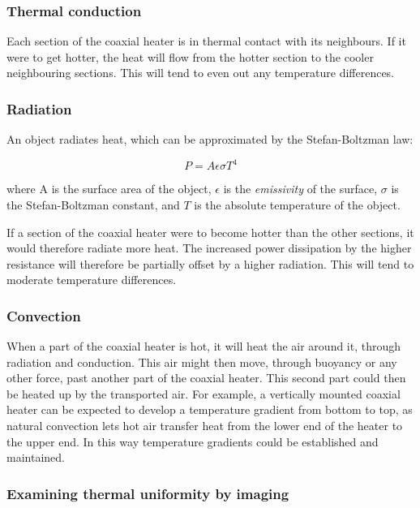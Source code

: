 \subsubsection{Thermal conduction}

Each section of the coaxial heater is in thermal contact with its neighbours. If
it were to get hotter, the heat will flow from the hotter section to the cooler
neighbouring sections. This will tend to even out any temperature differences.

\subsubsection{Radiation}

An object radiates heat, which can be approximated by the Stefan-Boltzman law:

\begin{equation}\label{eq:1}
	P=A \epsilon \sigma T^4
\end{equation}

where A is the surface area of the object, \(\epsilon\) is the
\textit{emissivity} of the surface, \(\sigma\) is the Stefan-Boltzman constant,
and \(T\) is the absolute temperature of the object. 

If a section of the coaxial heater were to become hotter than the other
sections, it would therefore radiate more heat. The increased power dissipation
by the higher resistance will therefore be partially offset by a higher
radiation. This will tend to moderate temperature differences.

\subsubsection{Convection}

When a part of the coaxial heater is hot, it will heat the air around it,
through radiation and conduction. This air might then move, through buoyancy or
any other force, past another part of the coaxial heater. This second part could
then be heated up by the transported air. For example, a vertically mounted
coaxial heater can be expected to develop a temperature gradient from bottom to
top, as natural convection lets hot air transfer heat from the lower end of the
heater to the upper end. In this way temperature gradients could be established
and maintained.

\subsubsection{Examining thermal uniformity by imaging}

